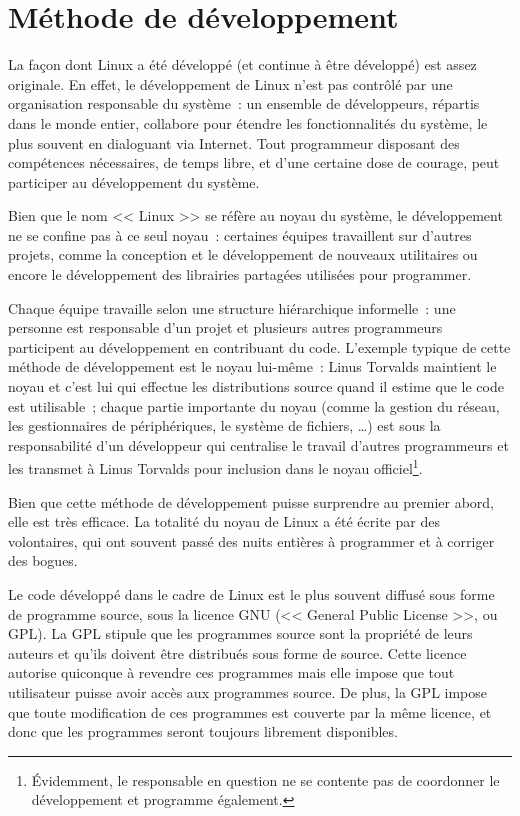 \documentclass[11pt,a4paper]{article}
\begin{document}
\section{Méthode de développement}

	La façon dont Linux a été développé (et continue à être développé) est
assez originale. En effet, le développement de Linux n'est pas contrôlé par une
organisation responsable du système~: un ensemble de développeurs, répartis
dans le monde entier, collabore pour étendre les fonctionnalités du système,
le plus souvent en dialoguant via Internet. Tout programmeur disposant des
compétences nécessaires, de temps libre, et d'une certaine dose de courage,
peut participer au développement du système.

	Bien que le nom << Linux >> se réfère au noyau du système, le
développement ne se confine pas à ce seul noyau~: certaines équipes
travaillent sur d'autres projets, comme la conception et le développement
de nouveaux utilitaires ou encore le développement des librairies partagées
utilisées pour programmer.

	Chaque équipe travaille selon une structure hiérarchique informelle~:
une personne est responsable d'un projet et plusieurs autres
programmeurs participent au développement en contribuant du code. L'exemple
typique de cette méthode de développement est le noyau lui-même~: Linus
Torvalds maintient le noyau et c'est lui qui effectue les distributions source
quand il estime que le code est utilisable~; chaque partie importante du
noyau (comme la gestion du réseau, les gestionnaires de périphériques, le
système de fichiers, \ldots) est sous la responsabilité d'un développeur
qui centralise le travail d'autres programmeurs et les transmet à Linus
Torvalds pour inclusion dans le noyau officiel\footnote{Évidemment, le
responsable en question ne se contente pas de coordonner le développement et
programme également.}.

	Bien que cette méthode de développement puisse surprendre au premier
abord, elle est très efficace. La totalité du noyau de Linux a été écrite
par des volontaires, qui ont souvent passé des nuits entières à programmer
et à corriger des bogues.

	Le code développé dans le cadre de Linux est le plus souvent diffusé
sous forme de programme source, sous la licence GNU (<< General Public
License >>, ou GPL). La GPL stipule que les programmes source sont la
propriété de leurs auteurs et qu'ils doivent être distribués sous forme de
source. Cette licence autorise quiconque à revendre ces programmes mais elle
impose que tout utilisateur puisse avoir accès aux programmes source. De plus,
la GPL impose que toute modification de ces programmes est couverte par la
même licence, et donc que les programmes seront toujours librement disponibles.
\end{document}
